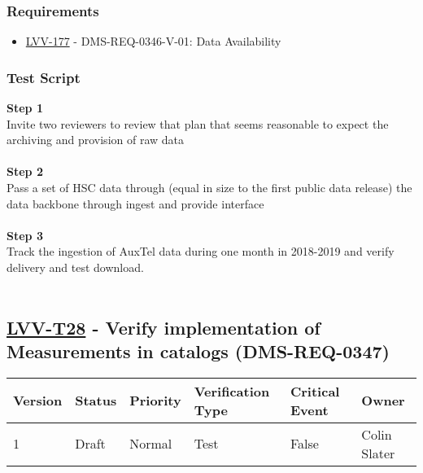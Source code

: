 \hypertarget{requirements-4}{%
\subsubsection{Requirements}\label{requirements-4}}

\begin{itemize}
\tightlist
\item
  \href{https://jira.lsstcorp.org/browse/LVV-177}{LVV-177} -
  DMS-REQ-0346-V-01: Data Availability
\end{itemize}

\hypertarget{test-script-4}{%
\subsubsection{Test Script}\label{test-script-4}}

\textbf{Step 1}\\
{Invite two reviewers to review that plan that seems reasonable to
expect the archiving and provision of raw data}\\
~\\
\textbf{Step 2}\\
Pass a set of HSC data through (equal in size to the first public data
release) the data backbone through ingest and provide interface\\
~\\
\textbf{Step 3}\\
Track the ingestion of AuxTel data during one month in 2018-2019 and
verify delivery and test download.\\
~\\

\hypertarget{lvv-t28---verify-implementation-of-measurements-in-catalogs-dms-req-0347}{%
\subsection{\texorpdfstring{\href{https://jira.lsstcorp.org/secure/Tests.jspa\#/testCase/LVV-T28}{LVV-T28}
- Verify implementation of Measurements in catalogs
(DMS-REQ-0347)}{LVV-T28 - Verify implementation of Measurements in catalogs (DMS-REQ-0347)}}\label{lvv-t28---verify-implementation-of-measurements-in-catalogs-dms-req-0347}}

\begin{longtable}[]{@{}llllll@{}}
\toprule
Version & Status & Priority & Verification Type & Critical Event &
Owner\tabularnewline
\midrule
\endhead
1 & Draft & Normal & Test & False & Colin Slater\tabularnewline
\bottomrule
\end{longtable}

